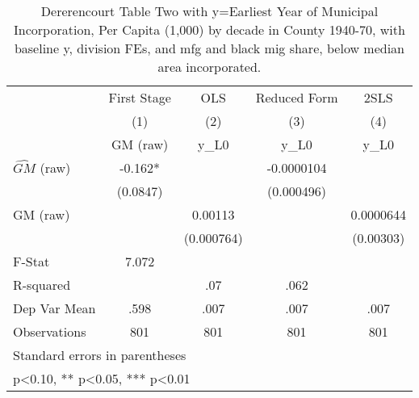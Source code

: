 \begin{table}[htbp]\centering
\def\sym#1{\ifmmode^{#1}\else\(^{#1}\)\fi}
\caption{Dererencourt Table Two with y=Earliest Year of Municipal Incorporation, Per Capita (1,000) by decade in County 1940-70, with baseline y, division FEs, and mfg and black mig share, below median area incorporated.}
\begin{tabular}{l*{4}{c}}
\toprule
                    & First Stage   &         OLS   &Reduced Form   &        2SLS   \\
                    &\multicolumn{1}{c}{(1)}&\multicolumn{1}{c}{(2)}&\multicolumn{1}{c}{(3)}&\multicolumn{1}{c}{(4)}\\
                    &\multicolumn{1}{c}{GM  (raw)}&\multicolumn{1}{c}{y\_L0}&\multicolumn{1}{c}{y\_L0}&\multicolumn{1}{c}{y\_L0}\\
\midrule
$\hat{GM}$ (raw)    &      -0.162*  &               &  -0.0000104   &               \\
                    &    (0.0847)   &               &  (0.000496)   &               \\
\addlinespace
GM  (raw)           &               &     0.00113   &               &   0.0000644   \\
                    &               &  (0.000764)   &               &   (0.00303)   \\
\midrule
F-Stat              &       7.072   &               &               &               \\
R-squared           &               &         .07   &        .062   &               \\
Dep Var Mean        &        .598   &        .007   &        .007   &        .007   \\
Observations        &         801   &         801   &         801   &         801   \\
\bottomrule
\multicolumn{5}{l}{\footnotesize Standard errors in parentheses}\\
\multicolumn{5}{l}{\footnotesize * p<0.10, ** p<0.05, *** p<0.01}\\
\end{tabular}
\end{table}
